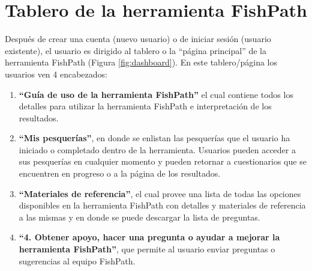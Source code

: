 \documentclass[
  11pt,
]{book}
\providecommand{\tightlist}{%
  \setlength{\itemsep}{0pt}\setlength{\parskip}{0pt}}
\begin{document}
\hypertarget{tablero-de-la-herramienta-fishpath}{%
\section{Tablero de la herramienta FishPath}\label{tablero-de-la-herramienta-fishpath}}

Después de crear una cuenta (nuevo usuario) o de iniciar sesión (usuario existente), el usuario es dirigido al tablero o la ``página principal'' de la herramienta FishPath (Figura \ref{fig:dashboard}). En este tablero/página los usuarios ven 4 encabezados:

\begin{enumerate}
\def\labelenumi{\arabic{enumi}.}
\tightlist
\item
  \textbf{``Guía de uso de la herramienta FishPath''} el cual contiene todos los detalles para utilizar la herramienta FishPath e interpretación de los resultados.
\item
  \textbf{``Mis pesquerías''}, en donde se enlistan las pesquerías que el usuario ha iniciado o completado dentro de la herramienta. Usuarios pueden acceder a sus pesquerías en cualquier momento y pueden retornar a cuestionarios que se encuentren en progreso o a la página de los resultados.
\item
  \textbf{``Materiales de referencia''}, el cual provee una lista de todas las opciones disponibles en la herramienta FishPath con detalles y materiales de referencia a las mismas y en donde se puede descargar la lista de preguntas.
\item
  \textbf{``4. Obtener apoyo, hacer una pregunta o ayudar a mejorar la herramienta FishPath''}, que permite al usuario enviar preguntas o sugerencias al equipo FishPath.
\end{enumerate}
\end{document}
